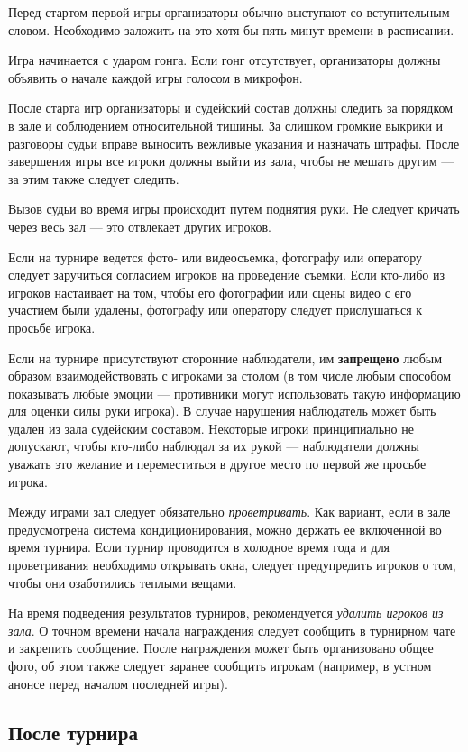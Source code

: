 Перед стартом первой игры организаторы обычно выступают со вступительным словом. Необходимо заложить на это хотя бы пять минут времени в расписании.

Игра начинается с ударом гонга. Если гонг отсутствует, организаторы должны объявить о начале каждой игры голосом в микрофон.

После старта игр организаторы и судейский состав должны следить за порядком в зале и соблюдением относительной тишины. За слишком громкие выкрики и разговоры судьи вправе выносить вежливые указания и назначать штрафы. После завершения игры все игроки должны выйти из зала, чтобы не мешать другим --- за этим также следует следить.

Вызов судьи во время игры происходит путем поднятия руки. Не следует кричать через весь зал --- это отвлекает других игроков.

Если на турнире ведется фото- или видеосъемка, фотографу или оператору следует заручиться согласием игроков на проведение съемки. Если кто-либо из игроков настаивает на том, чтобы его фотографии или сцены видео с его участием были удалены, фотографу или оператору следует прислушаться к просьбе игрока.

Если на турнире присутствуют сторонние наблюдатели, им \textbf{запрещено} любым образом взаимодействовать с игроками за столом (в том числе любым способом показывать любые эмоции --- противники могут использовать такую информацию для оценки силы руки игрока). В случае нарушения наблюдатель может быть удален из зала судейским составом. Некоторые игроки принципиально не допускают, чтобы кто-либо наблюдал за их рукой --- наблюдатели должны уважать это желание и переместиться в другое место по первой же просьбе игрока.

Между играми зал следует обязательно \textit{проветривать}. Как вариант, если в зале предусмотрена система кондиционирования, можно держать ее включенной во время турнира. Если турнир проводится в холодное время года и для проветривания необходимо открывать окна, следует предупредить игроков о том, чтобы они озаботились теплыми вещами.

На время подведения результатов турниров, рекомендуется \textit{удалить игроков из зала}. О точном времени начала награждения следует сообщить в турнирном чате и закрепить сообщение. После награждения может быть организовано общее фото, об этом также следует заранее сообщить игрокам (например, в устном анонсе перед началом последней игры).

\subsection{После турнира}


